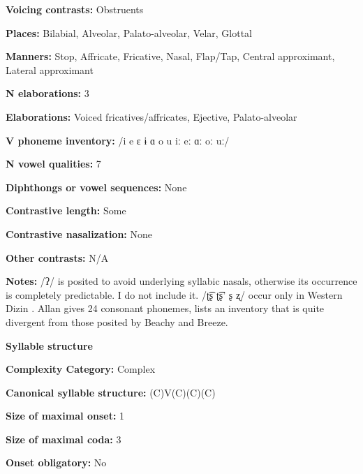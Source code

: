 \textbf{Voicing contrasts:} Obstruents



\textbf{Places:} Bilabial, Alveolar, Palato-alveolar, Velar, Glottal



\textbf{Manners:} Stop, Affricate, Fricative, Nasal, Flap/Tap, Central approximant, Lateral approximant



\textbf{N elaborations:} 3



\textbf{Elaborations:} Voiced fricatives/affricates, Ejective, Palato-alveolar



\textbf{V phoneme inventory:} /i e ɛ ɨ ɑ o u iː eː ɑː oː uː/



\textbf{N vowel qualities:} 7



\textbf{Diphthongs or vowel sequences:} None



\textbf{Contrastive length:} Some



\textbf{Contrastive nasalization:} None



\textbf{Other contrasts:} N/A



\textbf{Notes:} /ʔ/ is posited to avoid underlying syllabic nasals, otherwise its occurrence is completely predictable. I do not include it. /ʈ͡ʂ ʈ͡ʂ’ ʂ ʐ/ occur only in Western Dizin \citep{Beach2005}. Allan gives 24 consonant phonemes, lists an inventory that is quite divergent from those posited by Beachy and Breeze.



\textbf{Syllable structure}



\textbf{Complexity Category:} Complex



\textbf{Canonical syllable structure:} (C)V(C)(C)(C) \citep[38-46]{Beachy2005}



\textbf{Size of maximal onset:} 1



\textbf{Size of maximal coda:} 3



\textbf{Onset obligatory:} No



